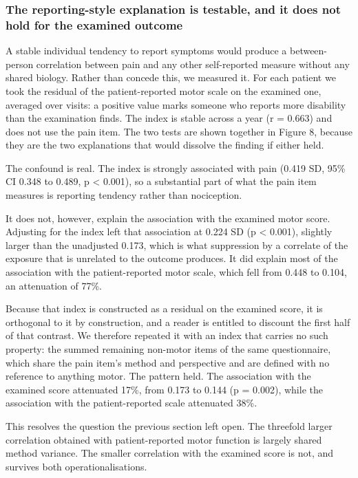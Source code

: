 \documentclass[
  english,
  12pt,
]{article}
\begin{document}
\subsubsection{The reporting-style explanation is testable, and it does not hold for the examined outcome}\label{the-reporting-style-explanation-is-testable-and-it-does-not-hold-for-the-examined-outcome}

A stable individual tendency to report symptoms would produce a between-person correlation between pain and any other self-reported measure without any shared biology. Rather than concede this, we measured it. For each patient we took the residual of the patient-reported motor scale on the examined one, averaged over visits: a positive value marks someone who reports more disability than the examination finds. The index is stable across a year (r = 0.663) and does not use the pain item. The two tests are shown together in Figure 8, because they are the two explanations that would dissolve the finding if either held.

The confound is real. The index is strongly associated with pain (0.419 SD, 95\% CI 0.348 to 0.489, p \textless{} 0.001), so a substantial part of what the pain item measures is reporting tendency rather than nociception.

It does not, however, explain the association with the examined motor score. Adjusting for the index left that association at 0.224 SD (p \textless{} 0.001), slightly larger than the unadjusted 0.173, which is what suppression by a correlate of the exposure that is unrelated to the outcome produces. It did explain most of the association with the patient-reported motor scale, which fell from 0.448 to 0.104, an attenuation of 77\%.

Because that index is constructed as a residual on the examined score, it is orthogonal to it by construction, and a reader is entitled to discount the first half of that contrast. We therefore repeated it with an index that carries no such property: the summed remaining non-motor items of the same questionnaire, which share the pain item's method and perspective and are defined with no reference to anything motor. The pattern held. The association with the examined score attenuated 17\%, from 0.173 to 0.144 (p = 0.002), while the association with the patient-reported scale attenuated 38\%.

This resolves the question the previous section left open. The threefold larger correlation obtained with patient-reported motor function is largely shared method variance. The smaller correlation with the examined score is not, and survives both operationalisations.
\end{document}

